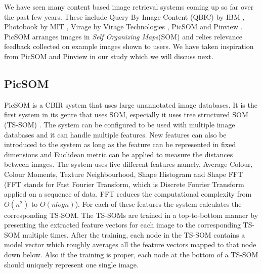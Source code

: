 \documentclass[english]{tktltiki}
\begin{document}
We have seen many content based image retrieval systems coming up so far over the past few years. These include Query By Image Content (QBIC) by IBM \cite{QBIC}, Photobook by MIT \cite{Photobook}, Virage by Virage Technologies \cite{Virage}, PicSOM \cite{PicSOM} and Pinview \cite{Pinview}. PicSOM arranges images in \textit{Self Organizing Maps}(SOM) \cite{SOM} and relies relevance feedback collected on example images shown to users. We have taken inspiration from PicSOM and Pinview in our study which we will discuss next.

\subsection{PicSOM}

PicSOM is a CBIR system that uses large unannotated image databases. It is the first system in its genre that uses SOM, especially it uses tree structured SOM (TS-SOM) \cite{TSSOM, TSSOM_progress}. The system can be configured to be used with multiple image databases and it can handle multiple features. New features can also be introduced to the system as long as the feature can be represented in fixed dimensions and Euclidean metric can be applied to measure the distances between images. The system uses five different features namely, Average Colour, Colour Moments, Texture Neighbourhood, Shape Histogram and Shape FFT (FFT stands for Fast Fourier Transform, which is Discrete Fourier Transform applied on a sequence of data. FFT reduces the computational complexity from $O(n^2)$ to $O(nlogn)$). For each of these features the system calculates the corresponding TS-SOM. The TS-SOMs are trained in a top-to-bottom manner by presenting the extracted feature vectors for each image to the corresponding TS-SOM multiple times. After the training, each node in the TS-SOM contains a model vector which roughly averages all the feature vectors mapped to that node down below. Also if the training is proper, each node at the bottom of a TS-SOM should uniquely represent one single image.
\end{document}
